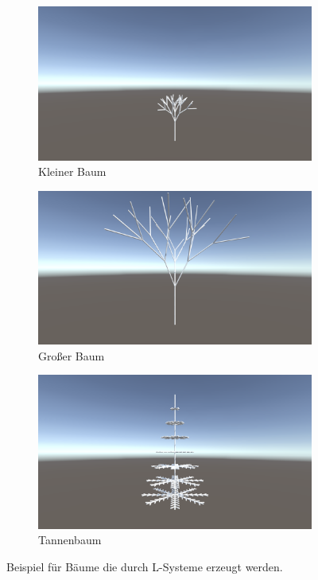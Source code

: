 \begin{figure}[ht]
    \begin{subfigure}[t]{.3\textwidth}
        \centering
        \includegraphics[width=\linewidth]{chapters/05_Technische_Umsetzung/03_World_Generation/Performance/small.png}
        \caption*{Kleiner Baum}
    \end{subfigure}
    \hfill
    \begin{subfigure}[t]{.3\textwidth}
        \centering
        \includegraphics[width=\linewidth]{chapters/05_Technische_Umsetzung/03_World_Generation/Performance/big.png}
        \caption*{Großer Baum}
    \end{subfigure}
    \hfill
    \begin{subfigure}[t]{.3\textwidth}
        \centering
        \includegraphics[width=\linewidth]{chapters/05_Technische_Umsetzung/03_World_Generation/Performance/tannenbaum.png}
        \caption*{Tannenbaum}
    \end{subfigure}
    \caption[L-System Bäume]{Beispiel für Bäume die durch L-Systeme erzeugt werden.}\label{fig:Trees}
\end{figure}



